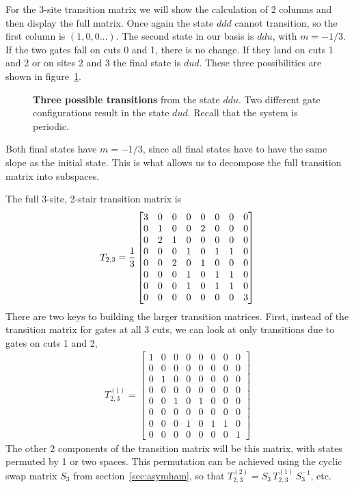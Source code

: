 For the 3-site transition matrix we will show the calculation of 2 columns and then display the full matrix. Once again the state $ddd$ cannot transition, so the first column is $(1,0,0\dots)$. The second state in our basis is $ddu$, with $m=-1/3$. If the two gates fall on cuts 0 and 1, there is no change. If they land on cuts 1 and 2 or on sites 2 and 3 the final state is $dud$. These three possibilities are shown in figure~\ref{fig:3trans}.
\begin{figure}
	\centering
	
	\caption{\textbf{Three possible transitions} from the state $ddu$. Two different gate configurations result in the state $dud$. Recall that the system is periodic.}
	\label{fig:3trans}
\end{figure}
Both final states have $m=-1/3$, since all final states have to have the same slope as the initial state. This is what allows us to decompose the full transition matrix into subspaces. 

The full 3-site, 2-stair transition matrix is
\begin{align}
T_{2,3} = 
\frac{1}{3}\begin{bmatrix}
	3 & 0 & 0 & 0 & 0 & 0 & 0 & 0\\
	0 & 1 & 0 & 0 & 2 & 0 & 0 & 0\\
	0 & 2 & 1 & 0 & 0 & 0 & 0 & 0\\
	0 & 0 & 0 & 1 & 0 & 1 & 1 & 0\\
	0 & 0 & 2 & 0 & 1 & 0 & 0 & 0\\
	0 & 0 & 0 & 1 & 0 & 1 & 1 & 0\\
	0 & 0 & 0 & 1 & 0 & 1 & 1 & 0\\
	0 & 0 & 0 & 0 & 0 & 0 & 0 & 3
	\end{bmatrix}
\end{align}
There are two keys to building the larger transition matrices. First, instead of the transition matrix for gates at all 3 cuts, we can look at only transitions due to gates on cuts 1 and 2,
\begin{align}
T_{2,3}^{(1)} =
\begin{bmatrix}
	1 & 0 & 0 & 0 & 0 & 0 & 0 & 0\\
	0 & 0 & 0 & 0 & 0 & 0 & 0 & 0\\
	0 & 1 & 0 & 0 & 0 & 0 & 0 & 0\\
	0 & 0 & 0 & 0 & 0 & 0 & 0 & 0\\
	0 & 0 & 1 & 0 & 1 & 0 & 0 & 0\\
	0 & 0 & 0 & 0 & 0 & 0 & 0 & 0\\
	0 & 0 & 0 & 1 & 0 & 1 & 1 & 0\\
	0 & 0 & 0 & 0 & 0 & 0 & 0 & 1
	\end{bmatrix}
\end{align}
The other 2 components of the transition matrix will be this matrix, with states permuted by 1 or two spaces. This permutation can be achieved using the cyclic swap matrix $S_3$ from section~\ref{sec:asymham}, so that $T_{2,3}^{(2)}=S_3\,T_{2,3}^{(1)}\,S_3^{-1}$, etc.

